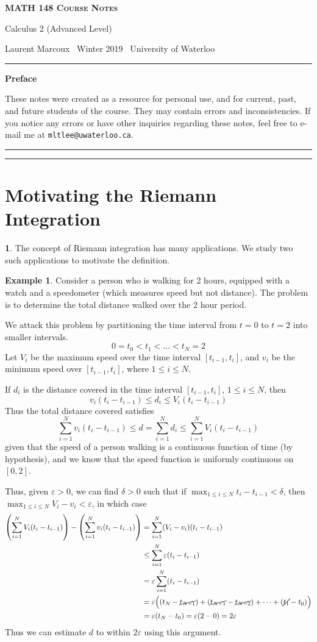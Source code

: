 \documentclass[11pt]{article}
\makeatletter
\theoremstyle{definition}
\newtheorem{exmp}[thm]{Example}
\newtheorem{none}[thm]{}
\newcommand{\newtitle}[4]{
  \begin{center}
	\huge{\textbf{\textsc{#1 Course Notes}}}
    
	\large{\sc #2}
    
	{\sc #3 \textbullet\, #4 \textbullet\, University of Waterloo}
	\normalsize\vspace{1cm}\hrule\vspace{0.5cm}
	
	\textbf{Preface}
  \end{center}
  \vspace{-0.4cm}
  These notes were created as a resource for personal use, and for current, past, and future students of the course. They may contain errors and inconsistencies. If you notice any errors or have other inquiries regarding these notes, feel free to e-mail me at {\tt mltlee@uwaterloo.ca}. \vspace{1cm}\hrule\vspace{0.5cm}
}
\makeatother
\begin{document}
\newtitle{MATH 148}{Calculus 2 (Advanced Level)}{Laurent Marcoux}{Winter 2019}

\tableofcontents\thispagestyle{fancy}
\vspace{1cm}\hrule
\newpage
{}

\section{Motivating the Riemann Integration}

\begin{none} 
The concept of Riemann integration has many applications. We study two such applications to motivate the definition.
\end{none}

\begin{exmp}
Consider a person who is walking for 2 hours, equipped with a watch and a speedometer (which measures speed but not distance). The problem is to determine the total distance walked over the 2 hour period. 

We attack this problem by partitioning the time interval from $t = 0$ to $t = 2$ into smaller intervals.
$$0 = t_0 < t_1 < \dots < t_N = 2$$
Let $V_i$ be the maximum speed over the time interval $[t_{i-1}, t_i]$, and $v_i$ be the minimum speed over $[t_{i-1}, t_i]$, where $1 \leq i \leq N$. 

If $d_i$ is the distance covered in the time interval $[t_{i-1}, t_i]$, $1 \leq i \leq N$, then 
$$v_i (t_i - t_{i-1}) \leq d_i \leq V_i (t_i - t_{i-1})$$
Thus the total distance covered satisfies
$$\sum_{i=1}^N v_i (t_i - t_{i-1}) \leq d = \sum_{i=1}^N d_i \leq \sum_{i=1}^N V_i (t_i - t_{i-1})$$
given that the speed of a person walking is a continuous function of time (by hypothesis), and we know that the speed function is uniformly continuous on $[0, 2]$.

Thus, given $\varepsilon > 0$, we can find $\delta > 0$ such that if $\max_{1 \leq i \leq N} t_i - t_{i-1} < \delta$, then $\max_{1 \leq i \leq N} V_i - v_i < \varepsilon$, in which case
\begin{align*}
\left(\sum_{i=1}^N V_i (t_i - t_{i-1})\right) - \left(\sum_{i=1}^N v_i (t_i - t_{i-1})\right) 
& = \sum_{i=1}^N (V_i - v_i)(t_i - t_{i-1}) \\
& \leq \sum_{i=1}^N \varepsilon(t_i - t_{i-1}) \\
& = \varepsilon \sum_{i=1}^N (t_i - t_{i-1}) \\
& = \varepsilon \Big( (t_N - \cancel{t_{N-1}}) + (\cancel{t_{N-1}} - \cancel{t_{N-2}}) + \dots + (\cancel{t_1} - t_0)\Big) \\
& = \varepsilon(t_N - t_0) = \varepsilon(2 - 0) = 2\varepsilon
\end{align*}
Thus we can estimate $d$ to within $2\varepsilon$ using this argument.
\end{exmp}
\end{document}
